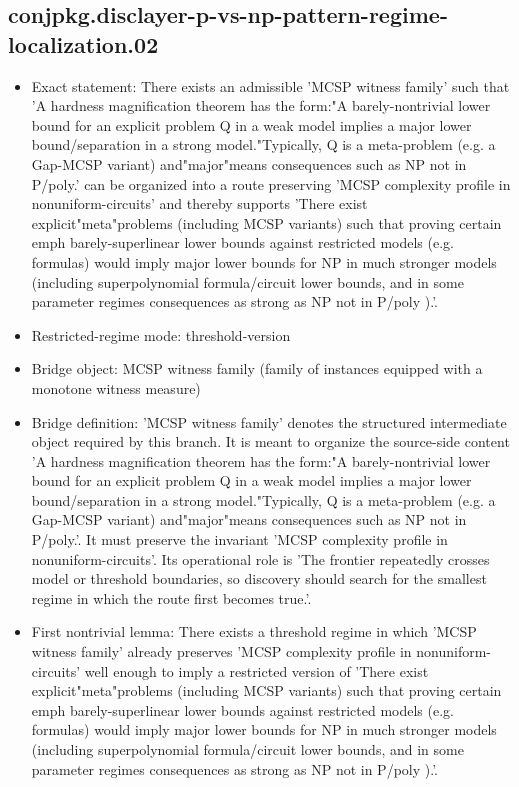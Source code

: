 \documentclass[11pt]{article}
\begin{document}
\subsection*{conjpkg.disclayer-p-vs-np-pattern-regime-localization.02}
\begin{itemize}
\item Exact statement: There exists an admissible 'MCSP witness family' such that 'A hardness magnification theorem has the form:"A barely-nontrivial lower bound for an explicit problem Q in a weak model implies a major lower bound/separation in a strong model."Typically, Q is a meta-problem (e.g. a Gap-MCSP variant) and"major"means consequences such as NP not in P/poly.' can be organized into a route preserving 'MCSP complexity profile in nonuniform-circuits' and thereby supports 'There exist explicit"meta"problems (including MCSP variants) such that proving certain emph barely-superlinear lower bounds against restricted models (e.g. formulas) would imply major lower bounds for NP in much stronger models (including superpolynomial formula/circuit lower bounds, and in some parameter regimes consequences as strong as NP not in P/poly ).'.
\item Restricted-regime mode: threshold-version
\item Bridge object: MCSP witness family (family of instances equipped with a monotone witness measure)
\item Bridge definition: 'MCSP witness family' denotes the structured intermediate object required by this branch. It is meant to organize the source-side content 'A hardness magnification theorem has the form:"A barely-nontrivial lower bound for an explicit problem Q in a weak model implies a major lower bound/separation in a strong model."Typically, Q is a meta-problem (e.g. a Gap-MCSP variant) and"major"means consequences such as NP not in P/poly.'. It must preserve the invariant 'MCSP complexity profile in nonuniform-circuits'. Its operational role is 'The frontier repeatedly crosses model or threshold boundaries, so discovery should search for the smallest regime in which the route first becomes true.'.
\item First nontrivial lemma: There exists a threshold regime in which 'MCSP witness family' already preserves 'MCSP complexity profile in nonuniform-circuits' well enough to imply a restricted version of 'There exist explicit"meta"problems (including MCSP variants) such that proving certain emph barely-superlinear lower bounds against restricted models (e.g. formulas) would imply major lower bounds for NP in much stronger models (including superpolynomial formula/circuit lower bounds, and in some parameter regimes consequences as strong as NP not in P/poly ).'.

\end{itemize}
\end{document}
